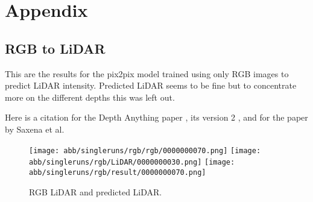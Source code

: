 \section{Appendix}
\subsection{RGB to LiDAR}

This are the results for the pix2pix model trained using only RGB images to predict LiDAR intensity. Predicted LiDAR seems to be fine but to concentrate more on the different depths this was left out.

Here is a citation for the Depth Anything paper \cite{depthanything}, its version 2 \cite{depth_anything_v2}, and for the paper by Saxena et al. \cite{saxena2008depth}
\begin{figure}[!ht]
	\centering
	\texttt{[image: abb/singleruns/rgb/rgb/0000000070.png]}
	\texttt{[image: abb/singleruns/rgb/LiDAR/0000000030.png]}
	\texttt{[image: abb/singleruns/rgb/result/0000000070.png]}
	\caption{RGB LiDAR and predicted LiDAR.}
	\label{rgb}
\end{figure}


